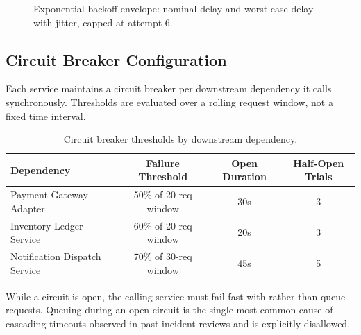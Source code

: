\begin{figure}[h!]
\centering
{}
\caption{Exponential backoff envelope: nominal delay and worst-case delay with jitter, capped at attempt 6.}
\label{fig:backoff}
\end{figure}

\subsection{Circuit Breaker Configuration}
Each service maintains a circuit breaker per downstream dependency it calls synchronously.
Thresholds are evaluated over a rolling request window, not a fixed time interval.

\begin{table}[h!]
\centering
\small
\begin{tabularx}{\linewidth}{@{}X c c c@{}}
\toprule
\textbf{Dependency} & \textbf{Failure Threshold} & \textbf{Open Duration} & \textbf{Half-Open Trials} \\
\midrule
Payment Gateway Adapter        & 50\% of 20-req window & 30s & 3 \\
Inventory Ledger Service       & 60\% of 20-req window & 20s & 3 \\
Notification Dispatch Service  & 70\% of 30-req window & 45s & 5 \\
\bottomrule
\end{tabularx}
\caption{Circuit breaker thresholds by downstream dependency.}
\end{table}

\begin{warnbox}
While a circuit is open, the calling service must fail fast with 
rather than queue requests. Queuing during an open circuit is the single most common cause of
cascading timeouts observed in past incident reviews and is explicitly disallowed.
\end{warnbox}

